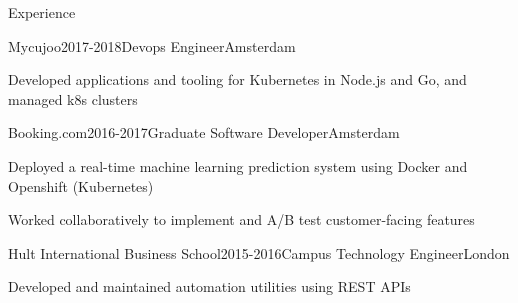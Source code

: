 \documentclass{resume} %
\begin{document}
\begin{rSection}{Experience}
\begin{rSubsection}{{Mycujoo}}{2017-2018}{Devops Engineer}{Amsterdam}
    \item Developed applications and tooling for Kubernetes in Node.js and Go, and managed k8s clusters
\end{rSubsection}

\begin{rSubsection}{{Booking.com}}{2016-2017}{Graduate Software Developer}{Amsterdam}
    \item Deployed a real-time machine learning prediction system using Docker and Openshift (Kubernetes)
    \item Worked collaboratively to implement and A/B test customer-facing features
\end{rSubsection}

\begin{rSubsection}{{Hult International Business School}}{2015-2016}{Campus Technology Engineer}{London}
    \item Developed and maintained automation utilities using REST APIs
\end{rSubsection}

\end{rSection}

\newpage

\end{document}

